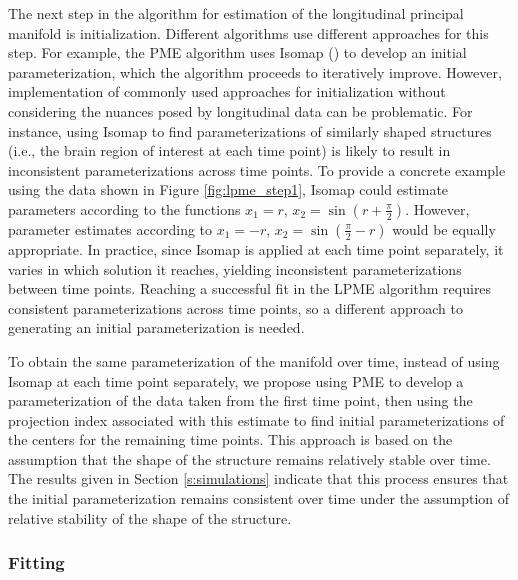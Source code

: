 \documentclass[11pt,reqno]{article}
\theoremstyle{definition}
\begin{document}
The next step in the algorithm for estimation of the longitudinal principal manifold is initialization. Different algorithms use different approaches for this step. For example, the PME algorithm uses Isomap (\cite{tenenbaumGlobalGeometricFramework2000}) to develop an initial parameterization, which the algorithm proceeds to iteratively improve. However, implementation of commonly used approaches for initialization without considering the nuances posed by longitudinal data can be problematic. For instance, using Isomap to find parameterizations of similarly shaped structures (i.e., the brain region of interest at each time point) is likely to result in inconsistent parameterizations across time points. To provide a concrete example using the data shown in Figure \ref{fig:lpme_step1}, Isomap could estimate parameters according to the functions $x_1 = r$, $x_2 = \sin(r + \frac{\pi}{2})$. However, parameter estimates according to $x_1 = -r$, $x_2 = \sin(\frac{\pi}{2} - r)$ would be equally appropriate. In practice, since Isomap is applied at each time point separately, it varies in which solution it reaches, yielding inconsistent parameterizations between time points. Reaching a successful fit in the LPME algorithm requires consistent parameterizations across time points, so a different approach to generating an initial parameterization is needed.

To obtain the same parameterization of the manifold over time, instead of using Isomap at each time point separately, we propose using PME to develop a parameterization of the data taken from the first time point, then using the projection index associated with this estimate to find initial parameterizations of the centers for the remaining time points. This approach is based on the assumption that the shape of the structure remains relatively stable over time. The results given in Section \ref{s:simulations} indicate that this process ensures that the initial parameterization remains consistent over time under the assumption of relative stability of the shape of the structure.

\subsubsection{Fitting}
\end{document}
